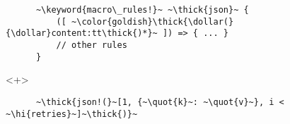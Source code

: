 \documentclass[usepdftitle=false,aspectratio=169]{beamer}
\newcommand{\dollar}{\makebox[\widthof{\$}][c]{\$}}
\newcommand{\thick}[1]{\contourlength{0.16pt}\contour[10]{black}{#1}}
\newcommand{\slantbox}[2][.5]
  {%
    \mbox
      {%
        \sbox{\foobox}{#2}%
        \hskip\wd\foobox
        \pdfsave
        \pdfsetmatrix{1 0 #1 1}%
        \llap{\usebox{\foobox}}%
        \pdfrestore
      }%
  }
\newcommand{\backslantbox}[2][.5]
  {%
    \mbox
      {%
        \sbox{\foobox}{#2}%
        \hskip\wd\foobox
        \pdfsave
        \pdfsetmatrix{-1 0 #1 1}%
        \llap{\usebox{\foobox}}%
        \pdfrestore
      }%
  }
\newcommand{\hi}[1]{%
\tikz[baseline=(A.base)]
 \node[highlighting=yellowbg,inner sep=0pt,text depth=0pt] (A) {#1};%
}
\newcommand{\openquote}{\backslantbox[.2]{\hspace{11pt}''\hspace{-11pt}}}
\newcommand{\closequote}{\slantbox[-.2]{\hspace{2pt}''\hspace{-2pt}}}
\newcommand{\blackquote}[1]{\openquote#1\closequote}
\newcommand{\quot}[1]{{\color{redish}\blackquote{#1}}}
\newcommand{\keyword}[1]{\color{greenish}#1}
\begin{document}
\begin{frame}[fragile]
\begin{onlyenv}
\begin{verbatim}
      ~\keyword{macro\_rules!}~ ~\thick{json}~ {
          ([ ~\color{goldish}\thick{\dollar(}{\dollar}content:tt\thick{)*}~ ]) => { ... }
          // other rules
      }
    \end{verbatim}
  \end{onlyenv}
  \begin{onlyenv}<+>
    \vspace{-20.5pt}
    \begin{verbatim}
      ~\thick{json!(}~[1, {~\quot{k}~: ~\quot{v}~}, i < ~\hi{retries}~]~\thick{)}~


\end{verbatim}
\end{onlyenv}
\end{frame}
\end{document}

